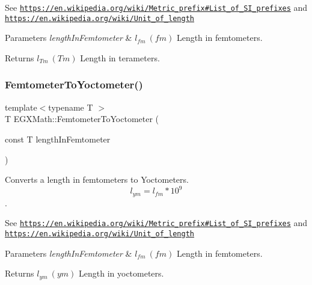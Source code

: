 See \href{https://en.wikipedia.org/wiki/Metric_prefix#List_of_SI_prefixes}{\tt https\+://en.\+wikipedia.\+org/wiki/\+Metric\+\_\+prefix\#\+List\+\_\+of\+\_\+\+S\+I\+\_\+prefixes} and \href{https://en.wikipedia.org/wiki/Unit_of_length}{\tt https\+://en.\+wikipedia.\+org/wiki/\+Unit\+\_\+of\+\_\+length} 
\begin{DoxyParams}{Parameters}
{\em length\+In\+Femtometer} & $ l_{fm}\ (fm)$ Length in femtometers. \\
\hline
\end{DoxyParams}
\begin{DoxyReturn}{Returns}
$ l_{Tm}\ (Tm)$ Length in terameters. 
\end{DoxyReturn}
\mbox{\label{group___e_g_x_math-_conversions-_length_conversions-_femtometer-_s_i_ga6406395140da34327a85098a7dd9e4f0}} 
\subsubsection{\texorpdfstring{Femtometer\+To\+Yoctometer()}{FemtometerToYoctometer()}}
{\footnotesize\ttfamily template$<$typename T $>$ \\
T E\+G\+X\+Math\+::\+Femtometer\+To\+Yoctometer (\begin{DoxyParamCaption}\item[{const T}]{length\+In\+Femtometer }\end{DoxyParamCaption})}



Converts a length in femtometers to Yoctometers. \[ l_{ym}=l_{fm} * 10^{9} \]. 

See \href{https://en.wikipedia.org/wiki/Metric_prefix#List_of_SI_prefixes}{\tt https\+://en.\+wikipedia.\+org/wiki/\+Metric\+\_\+prefix\#\+List\+\_\+of\+\_\+\+S\+I\+\_\+prefixes} and \href{https://en.wikipedia.org/wiki/Unit_of_length}{\tt https\+://en.\+wikipedia.\+org/wiki/\+Unit\+\_\+of\+\_\+length} 
\begin{DoxyParams}{Parameters}
{\em length\+In\+Femtometer} & $ l_{fm}\ (fm)$ Length in femtometers. \\
\hline
\end{DoxyParams}
\begin{DoxyReturn}{Returns}
$ l_{ym}\ (ym)$ Length in yoctometers. 
\end{DoxyReturn}
\mbox{\label{group___e_g_x_math-_conversions-_length_conversions-_femtometer-_s_i_gabee380e1753dab5aa9aa433b8f3ce4d4}} 
